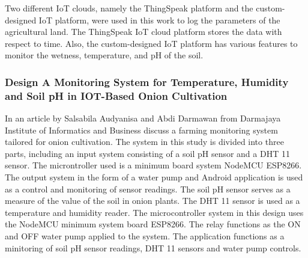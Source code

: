 \documentclass[12pt, a4paper]{article}
\begin{document}
Two different IoT clouds, namely the ThingSpeak platform and the custom-designed IoT platform, were used in this work to log the parameters of the agricultural land. The ThingSpeak IoT cloud platform stores the data with respect to time. Also, the custom-designed IoT platform has various features to monitor the wetness, temperature, and pH of the soil.

\subsubsection{Design A Monitoring System for Temperature, Humidity and Soil pH in IOT-Based Onion Cultivation}
In an article by Salsabila Audyanisa and Abdi Darmawan \cite{audyanisa2024design} from Darmajaya Institute of Informatics and Business discuss a farming monitoring system tailored for onion cultivation.
The system in this study is divided into three parts, including an input system consisting of a soil pH sensor and a DHT 11 sensor. The microntroller used is a minimum board system NodeMCU ESP8266. The output system in the form of a water pump and Android application is used as a control and monitoring of sensor readings. The soil pH sensor serves as a measure of the value of the soil in onion plants. The DHT 11 sensor is used as a temperature and humidity reader. The microcontroller system in this design uses the NodeMCU minimum system board ESP8266. The relay functions as the ON and OFF water pump applied to the system. The application functions as a minitoring of soil pH sensor readings, DHT 11 sensors and water pump controls.
\end{document}
